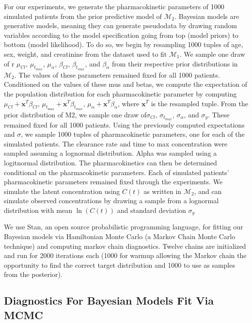 For our experiments, we generate the pharmacokinetic parameters of 1000 simulated patients from the prior predictive model of $ \mathcal{M}_2 $. Bayesian models are generative models, meaning they can generate pseudodata by drawing random variables according to the model specification going from top (model priors) to bottom (model likelihood).  To do so, we begin by resampling 1000 tuples of age, sex, weight, and creatinine from the dataset used to fit $ \mathcal{M_1} $. We sample one draw of r $ \mu_{Cl} $, $ \mu_{t_{max}} $, $ \mu_{\alpha}$, $ \beta_{Cl} $, $ \beta_{t_{max}} $, and $ \beta_{\alpha} $  from their respective prior distributions in  $ \mathcal{M}_2 $. The values of these parameters remained fixed for all 1000 patients. Conditioned on the values of these mus and betas, we compute the expectation of the population distribution for each pharmacokinetic parameter by computing $ \mu_{Cl} + \mathbf{x}^T \beta_{Cl} $, $ \mu_{t_{\max}} + \mathbf{x}^T \beta_{t_{max}} $,  $ \mu_{\alpha} + \mathbf{x}^T \beta_{\alpha} $, where $\mathbf{x}^T$ is the resampled tuple.  From the prior distribution of M2, we sample one draw of$ \sigma_{Cl} $, $ \sigma_{t_{max}} $, $ \sigma_{\alpha} $, and $ \sigma_y $.  These remained fixed for all 1000 patients. Using the previously computed expectations and $\sigma$, we sample 1000 tuples of pharmacokinetic parameters, one for each of the simulated patients.  The clearance rate and time to max concentration were sampled assuming a lognormal distribution.  Alpha was sampled using a logitnormal distribution. The pharmacokinetics can then be determined conditional on the pharmacokinetic parameters. Each of simulated patients' pharmacokinetic parameters remained fixed through the experiments.  We simulate the latent concentration using $ C(t) $ as written in $\mathcal{M}_2$, and can simulate observed concentrations by drawing a sample from a lognormal distribution with mean $\ln(C(t))$ and standard deviation $ \sigma_y$

We use Stan, an open source probabilistic programming language, for fitting our Bayesian models via Hamiltonian Monte Carlo (a Markov Chain Monte Carlo technique) and computing markov chain diagnostics. Twelve chains are initialized and run for 2000 iterations each (1000 for warmup allowing the Markov chain the opportunity to find the correct target distribution and 1000 to use as samples from the posterior).


\subsection{Diagnostics For Bayesian Models Fit Via MCMC}

